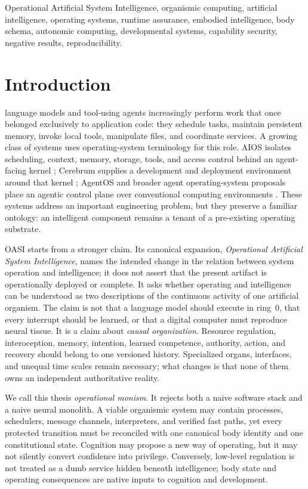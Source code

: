 \documentclass[journal,10pt]{IEEEtran}
\newcommand{\OASI}{\textsc{OASI}}
\begin{document}
\begin{IEEEkeywords}
Operational Artificial System Intelligence, organismic computing, artificial intelligence, operating systems, runtime assurance, embodied intelligence, body schema, autonomic computing, developmental systems, capability security, negative results, reproducibility.
\end{IEEEkeywords}

\section{Introduction}
 language models and tool-using agents increasingly perform work that once belonged exclusively to application code: they schedule tasks, maintain persistent memory, invoke local tools, manipulate files, and coordinate services. A growing class of systems uses operating-system terminology for this role. AIOS isolates scheduling, context, memory, storage, tools, and access control behind an agent-facing kernel \cite{mei2024aios}; Cerebrum supplies a development and deployment environment around that kernel \cite{rama2025cerebrum}; AgentOS and broader agent operating-system proposals place an agentic control plane over conventional computing environments \cite{liu2026agentos,sharma2026aos}. These systems address an important engineering problem, but they preserve a familiar ontology: an intelligent component remains a tenant of a pre-existing operating substrate.

\OASI{} starts from a stronger claim. Its canonical expansion, \emph{Operational Artificial System Intelligence}, names the intended change in the relation between system operation and intelligence; it does not assert that the present artifact is operationally deployed or complete. It asks whether operating and intelligence can be understood as two descriptions of the continuous activity of one artificial organism. The claim is not that a language model should execute in ring~0, that every interrupt should be learned, or that a digital computer must reproduce neural tissue. It is a claim about \emph{causal organization}. Resource regulation, interoception, memory, intention, learned competence, authority, action, and recovery should belong to one versioned history. Specialized organs, interfaces, and unequal time scales remain necessary; what changes is that none of them owns an independent authoritative reality.

We call this thesis \emph{operational monism}. It rejects both a naive software stack and a naive neural monolith. A viable organismic system may contain processes, schedulers, message channels, interpreters, and verified fast paths, yet every protected transition must be reconciled with one canonical body identity and one constitutional state. Cognition may propose a new way of operating, but it may not silently convert confidence into privilege. Conversely, low-level regulation is not treated as a dumb service hidden beneath intelligence; body state and operating consequences are native inputs to cognition and development.
\end{document}

